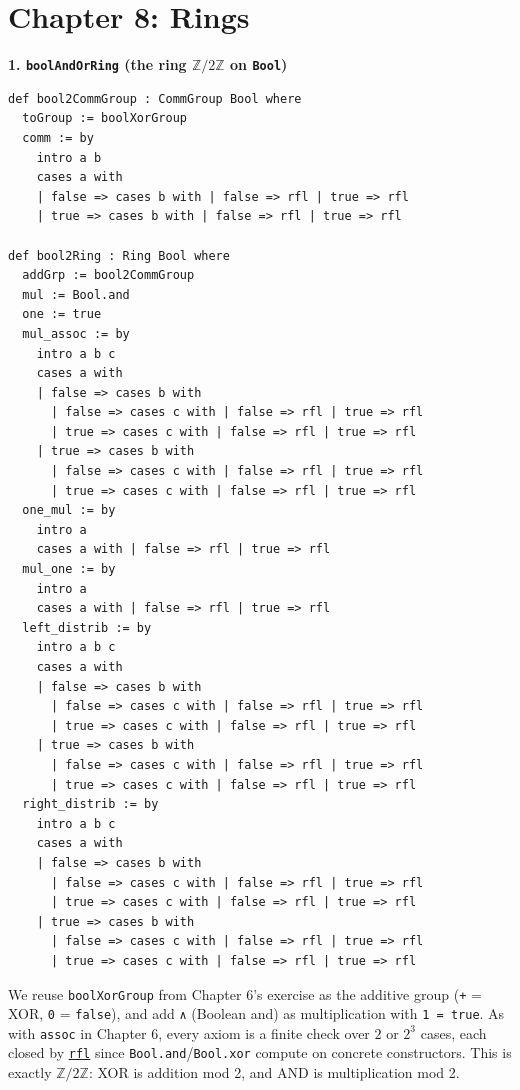 \section{Chapter 8: Rings}\label{sec:14-appendix-solutions:07-chapter-8:1}

\textbf{1. \texttt{boolAndOrRing} (the ring \(\mathbb{Z}/2\mathbb{Z}\) on \texttt{Bool})}

\begin{lstlisting}
def bool2CommGroup : CommGroup Bool where
  toGroup := boolXorGroup
  comm := by
    intro a b
    cases a with
    | false => cases b with | false => rfl | true => rfl
    | true => cases b with | false => rfl | true => rfl

def bool2Ring : Ring Bool where
  addGrp := bool2CommGroup
  mul := Bool.and
  one := true
  mul_assoc := by
    intro a b c
    cases a with
    | false => cases b with
      | false => cases c with | false => rfl | true => rfl
      | true => cases c with | false => rfl | true => rfl
    | true => cases b with
      | false => cases c with | false => rfl | true => rfl
      | true => cases c with | false => rfl | true => rfl
  one_mul := by
    intro a
    cases a with | false => rfl | true => rfl
  mul_one := by
    intro a
    cases a with | false => rfl | true => rfl
  left_distrib := by
    intro a b c
    cases a with
    | false => cases b with
      | false => cases c with | false => rfl | true => rfl
      | true => cases c with | false => rfl | true => rfl
    | true => cases b with
      | false => cases c with | false => rfl | true => rfl
      | true => cases c with | false => rfl | true => rfl
  right_distrib := by
    intro a b c
    cases a with
    | false => cases b with
      | false => cases c with | false => rfl | true => rfl
      | true => cases c with | false => rfl | true => rfl
    | true => cases b with
      | false => cases c with | false => rfl | true => rfl
      | true => cases c with | false => rfl | true => rfl
\end{lstlisting}

We reuse \texttt{boolXorGroup} from Chapter 6's exercise as the additive group (\texttt{+} = XOR, \texttt{0} = \texttt{false}), and add \texttt{∧} (Boolean and) as multiplication with \texttt{1 = true}. As with \texttt{assoc} in Chapter 6, every axiom is a finite check over \(2\) or \(2^3\) cases, each closed by \href{https://lean-lang.org/doc/reference/latest/Tactic-Proofs/Tactic-Reference/}{\texttt{rfl}} since \texttt{Bool.and}/\texttt{Bool.xor} compute on concrete constructors. This is exactly \(\mathbb{Z}/2\mathbb{Z}\): XOR is addition mod 2, and AND is multiplication mod 2.

